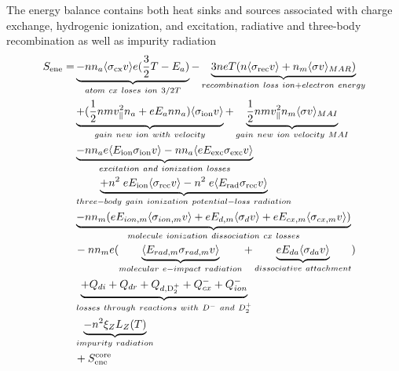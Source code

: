 \documentclass[amsmath,amssymb,a4]{revtex4-2}
\begin{document}
The energy balance contains both heat sinks and sources associated with charge exchange, hydrogenic ionization, and excitation, radiative and three-body recombination as well as impurity radiation
\begin{equation}\label{energy_source}
\begin{split}
    S_{\rm ene}= &\underbrace{-n n_a \langle\sigma_{\rm cx} v\rangle e (\frac{3}{2}T - E_{a})}_{atom~cx~loses~ ion ~3/2T}  - \underbrace{3 neT (n\langle\sigma_{\rm rec} v\rangle + n_m\langle\sigma v \rangle_{MAR})}_{recombination~loss~ion+electron~energy} \\
        &\underbrace{+ (\frac{1}{2} n m v^2_\parallel n_a +e E_a n n_a) \langle\sigma_{\rm ion} v\rangle}_{gain~new~ion~with~velocity} +\underbrace{\frac{1}{2} n m v_{\|}^2 n_m\langle\sigma v\rangle_{MAI}}_{gain~new~ion~velocity~MAI}\\
        & \underbrace{- n n_a e \langle E_{\rm ion} \sigma_{\rm ion} v\rangle - n n_a \langle eE_{\rm exc} \sigma_{\rm exc} v\rangle}_{excitation~ and ~ionization ~losses} \\
        &\underbrace{+ n^2  \; eE_{\rm ion} \langle \sigma_{\rm rec} v\rangle- n^2 \;e\langle E_{\rm rad} \sigma_{\rm rec} v\rangle}_{three-body~gain~ionization~potential-loss~radiation} \\
        &\underbrace{-nn_m(eE_{ion,m}\langle \sigma_{ion,m} v\rangle + eE_{d,m} \langle \sigma_{d}v\rangle+eE_{cx,m}\langle \sigma_{cx,m}v\rangle) }_{molecule~ionization~dissociation~cx~losses} \\
        &-nn_me(\underbrace{\langle E_{rad,m}\sigma_{rad,m}v\rangle}_{ molecular~e-impact~radiation}+\underbrace{eE_{da} \langle \sigma_{da}v\rangle}_{dissociative~attachment}) \\
        & \underbrace{+Q_{di}+Q_{dr}+Q_{d,\mathrm{D_2^+}} + Q_{cx}^- + Q_{ion}^-}_{losses~through~reactions~with~D^{-}~and~D_2^{+}} \\
        &\underbrace{- n^2 \xi_Z L_Z(T)}_{impurity~radiation}\\
         & + S^{\rm core}_{\rm ene}
\end{split}
\end{equation}
\end{document}
